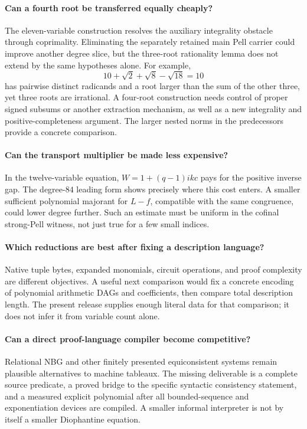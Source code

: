 \documentclass[11pt,letterpaper]{article}
\theoremstyle{remark}
\begin{document}
\paragraph{Can a fourth root be transferred equally cheaply?}
The eleven-variable construction resolves the auxiliary integrality
obstacle through coprimality.  Eliminating the separately retained main
Pell carrier could improve another degree slice, but the three-root
rationality lemma does not extend by the same hypotheses alone.
For example,
\[
 10+\sqrt2+\sqrt8-\sqrt{18}=10
\]
has pairwise distinct radicands and a root larger than the sum of the
other three, yet three roots are irrational.  A four-root construction
needs control of proper signed subsums or another extraction mechanism,
as well as a new integrality and positive-completeness argument.  The
larger nested norms in the predecessors provide a concrete comparison.

\paragraph{Can the transport multiplier be made less expensive?}
In the twelve-variable equation, $W=1+(q-1)ikc$ pays for the positive
inverse gap.  The degree-$84$ leading form shows precisely where this
cost enters.  A smaller sufficient polynomial majorant for $L-f$,
compatible with the same congruence, could lower degree further.  Such
an estimate must be uniform in the cofinal strong-Pell witness, not
just true for a few small indices.

\paragraph{Which reductions are best after fixing a description language?}
Native tuple bytes, expanded monomials, circuit operations, and proof
complexity are different objectives.  A useful next comparison would
fix a concrete encoding of polynomial arithmetic DAGs and coefficients,
then compare total description length.  The present release supplies
enough literal data for that comparison; it does not infer it from
variable count alone.

\paragraph{Can a direct proof-language compiler become competitive?}
Relational NBG and other finitely presented equiconsistent systems
remain plausible alternatives to machine tableaux.  The missing
deliverable is a complete source predicate, a proved bridge to the
specific syntactic consistency statement, and a measured explicit
polynomial after all bounded-sequence and exponentiation devices are
compiled.  A smaller informal interpreter is not by itself a smaller
Diophantine equation.
\end{document}

